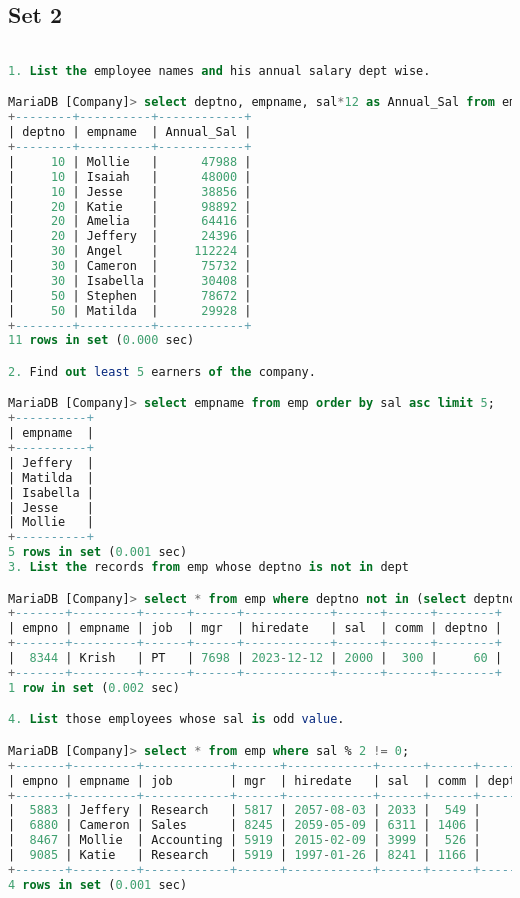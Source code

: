 \documentclass[11pt]{article}
\begin{document}
\subsection{Set 2}
\begin{lstlisting}[language=SQL]

1. List the employee names and his annual salary dept wise.

MariaDB [Company]> select deptno, empname, sal*12 as Annual_Sal from emp order by deptno;
+--------+----------+------------+
| deptno | empname  | Annual_Sal |
+--------+----------+------------+
|     10 | Mollie   |      47988 |
|     10 | Isaiah   |      48000 |
|     10 | Jesse    |      38856 |
|     20 | Katie    |      98892 |
|     20 | Amelia   |      64416 |
|     20 | Jeffery  |      24396 |
|     30 | Angel    |     112224 |
|     30 | Cameron  |      75732 |
|     30 | Isabella |      30408 |
|     50 | Stephen  |      78672 |
|     50 | Matilda  |      29928 |
+--------+----------+------------+
11 rows in set (0.000 sec)

2. Find out least 5 earners of the company.

MariaDB [Company]> select empname from emp order by sal asc limit 5;
+----------+
| empname  |
+----------+
| Jeffery  |
| Matilda  |
| Isabella |
| Jesse    |
| Mollie   |
+----------+
5 rows in set (0.001 sec)
3. List the records from emp whose deptno is not in dept

MariaDB [Company]> select * from emp where deptno not in (select deptno from dept);
+-------+---------+------+------+------------+------+------+--------+
| empno | empname | job  | mgr  | hiredate   | sal  | comm | deptno |
+-------+---------+------+------+------------+------+------+--------+
|  8344 | Krish   | PT   | 7698 | 2023-12-12 | 2000 |  300 |     60 |
+-------+---------+------+------+------------+------+------+--------+
1 row in set (0.002 sec)

4. List those employees whose sal is odd value.

MariaDB [Company]> select * from emp where sal % 2 != 0;
+-------+---------+------------+------+------------+------+------+--------+
| empno | empname | job        | mgr  | hiredate   | sal  | comm | deptno |
+-------+---------+------------+------+------------+------+------+--------+
|  5883 | Jeffery | Research   | 5817 | 2057-08-03 | 2033 |  549 |     20 |
|  6880 | Cameron | Sales      | 8245 | 2059-05-09 | 6311 | 1406 |     30 |
|  8467 | Mollie  | Accounting | 5919 | 2015-02-09 | 3999 |  526 |     10 |
|  9085 | Katie   | Research   | 5919 | 1997-01-26 | 8241 | 1166 |     20 |
+-------+---------+------------+------+------------+------+------+--------+
4 rows in set (0.001 sec)


\end{lstlisting}
\end{document}
